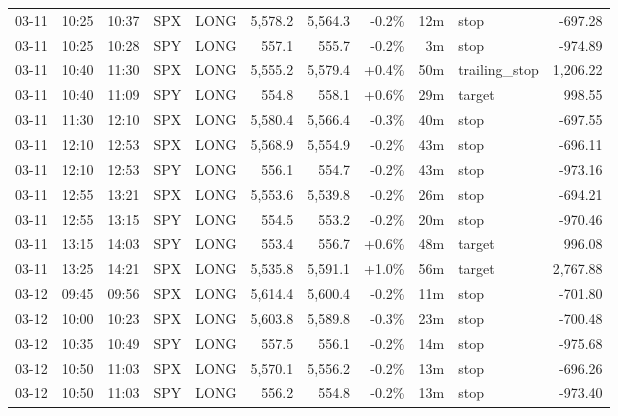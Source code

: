 \documentclass[11pt,a4paper,twoside]{article}
\begin{document}
\begin{center}
\begin{longtable}{>{\color{txtmain}}l l l l l r r r r >{\color{txtmain}}l r}
03-11 & 10:25 & 10:37 & SPX & LONG & 5,578.2 & 5,564.3 & \textcolor{lossred}{-0.2\%} & 12m & stop & \textcolor{lossred}{-697.28} \\
03-11 & 10:25 & 10:28 & SPY & LONG & 557.1 & 555.7 & \textcolor{lossred}{-0.2\%} & 3m & stop & \textcolor{lossred}{-974.89} \\
03-11 & 10:40 & 11:30 & SPX & LONG & 5,555.2 & 5,579.4 & \textcolor{wingreen}{+0.4\%} & 50m & trailing\_stop & \textcolor{wingreen}{1,206.22} \\
03-11 & 10:40 & 11:09 & SPY & LONG & 554.8 & 558.1 & \textcolor{wingreen}{+0.6\%} & 29m & target & \textcolor{wingreen}{998.55} \\
03-11 & 11:30 & 12:10 & SPX & LONG & 5,580.4 & 5,566.4 & \textcolor{lossred}{-0.3\%} & 40m & stop & \textcolor{lossred}{-697.55} \\
03-11 & 12:10 & 12:53 & SPX & LONG & 5,568.9 & 5,554.9 & \textcolor{lossred}{-0.2\%} & 43m & stop & \textcolor{lossred}{-696.11} \\
03-11 & 12:10 & 12:53 & SPY & LONG & 556.1 & 554.7 & \textcolor{lossred}{-0.2\%} & 43m & stop & \textcolor{lossred}{-973.16} \\
03-11 & 12:55 & 13:21 & SPX & LONG & 5,553.6 & 5,539.8 & \textcolor{lossred}{-0.2\%} & 26m & stop & \textcolor{lossred}{-694.21} \\
03-11 & 12:55 & 13:15 & SPY & LONG & 554.5 & 553.2 & \textcolor{lossred}{-0.2\%} & 20m & stop & \textcolor{lossred}{-970.46} \\
03-11 & 13:15 & 14:03 & SPY & LONG & 553.4 & 556.7 & \textcolor{wingreen}{+0.6\%} & 48m & target & \textcolor{wingreen}{996.08} \\
03-11 & 13:25 & 14:21 & SPX & LONG & 5,535.8 & 5,591.1 & \textcolor{wingreen}{+1.0\%} & 56m & target & \textcolor{wingreen}{2,767.88} \\
03-12 & 09:45 & 09:56 & SPX & LONG & 5,614.4 & 5,600.4 & \textcolor{lossred}{-0.2\%} & 11m & stop & \textcolor{lossred}{-701.80} \\
03-12 & 10:00 & 10:23 & SPX & LONG & 5,603.8 & 5,589.8 & \textcolor{lossred}{-0.3\%} & 23m & stop & \textcolor{lossred}{-700.48} \\
03-12 & 10:35 & 10:49 & SPY & LONG & 557.5 & 556.1 & \textcolor{lossred}{-0.2\%} & 14m & stop & \textcolor{lossred}{-975.68} \\
03-12 & 10:50 & 11:03 & SPX & LONG & 5,570.1 & 5,556.2 & \textcolor{lossred}{-0.2\%} & 13m & stop & \textcolor{lossred}{-696.26} \\
03-12 & 10:50 & 11:03 & SPY & LONG & 556.2 & 554.8 & \textcolor{lossred}{-0.2\%} & 13m & stop & \textcolor{lossred}{-973.40} \\

\end{longtable}
\end{center}
\end{document}
